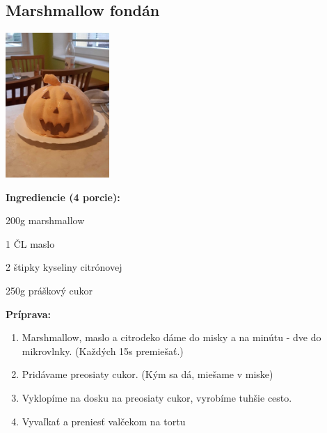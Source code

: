 \setcounter{step}{0}

\subsection{ Marshmallow fondán }

\begin{ingredient}
  
      \includegraphics[height=5.5cm]{images/pistkot_krem_salko}
  
  \def\portions{  }
  \textbf{ {\normalsize Ingrediencie (4 porcie):} }

  \begin{main}
      \item 200g marshmallow
      \item 1 ČL maslo
      \item 2 štipky kyseliny citrónovej
      \item 250g práškový cukor
  \end{main}
  
\end{ingredient}
\begin{recipe}
\textbf{ {\normalsize Príprava:} }
\begin{enumerate}

  \item{Marshmallow, maslo a citrodeko dáme do misky a na minútu - dve do mikrovlnky. (Každých 15s premiešať.)}
  \item{Pridávame preosiaty cukor. (Kým sa dá, miešame v miske)}
  \item{Vyklopíme na dosku na preosiaty cukor, vyrobíme tuhšie cesto.}
  \item{Vyvaľkať a preniesť valčekom na tortu}

\end{enumerate}
\end{recipe}

\begin{notes}
  
\end{notes}	
\clearpage

